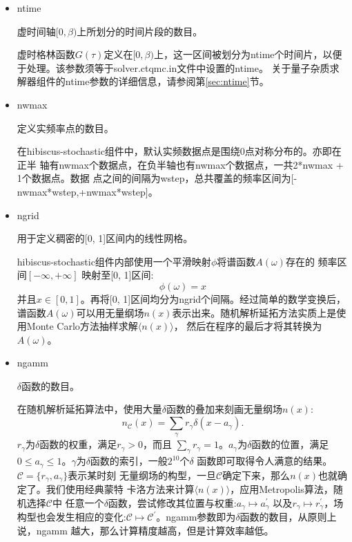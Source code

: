 \begin{itemize}
\item {\color{red}ntime}

虚时间轴$[0,\beta)$上所划分的时间片段的数目。

虚时格林函数$G(\tau)$定义在$[0,\beta)$上，这一区间被划分为ntime个时间片，以便
于处理。该参数须等于solver.ctqmc.in文件中设置的ntime。
关于量子杂质求解器组件的ntime参数的详细信息，请参阅第\ref{sec:ntime}节。

\item {\color{red}nwmax}

定义实频率点的数目。

在hibiscus-stochastic组件中，默认实频数据点是围绕0点对称分布的。亦即在正半
轴有nwmax个数据点，在负半轴也有nwmax个数据点，一共2*nwmax + 1个数据点。数据
点之间的间隔为wstep，总共覆盖的频率区间为[-nwmax*wstep,+nwmax*wstep]。

\item {\color{red}ngrid}

用于定义稠密的[0, 1]区间内的线性网格。

hibiscus-stochastic组件内部使用一个平滑映射$\phi$将谱函数$A(\omega)$存在的
频率区间$[−\infty, +\infty]$
映射至[0, 1]区间:
\begin{equation}
\phi(\omega) = x
\end{equation}
并且$x \in [0,1]$。再将[0, 1]区间均分为ngrid个间隔。经过简单的数学变换后，
谱函数$A(\omega)$可以用无量纲场$n(x)$表示出来。随机解析延拓方法实质上是使
用Monte Carlo方法抽样求解$\langle n(x) \rangle$，
然后在程序的最后才将其转换为$A(\omega)$。

\item {\color{red}ngamm}

$\delta$函数的数目。

在随机解析延拓算法中，使用大量$\delta$函数的叠加来刻画无量纲场$n(x)$:
\begin{equation}
\label{eq:ncx}
n_{\mathcal{C}}(x) = \sum_{\gamma} r_{\gamma} \delta(x - a_{\gamma}).
\end{equation}
$r_{\gamma}$为$\delta$函数的权重，满足$r_{\gamma} > 0 $，而且
$\sum_{\gamma}r_{\gamma} = 1$。$a_{\gamma}$为$\delta$函数的位置，满足
$0 \leq a_{\gamma} \leq 1$。$\gamma$为$\delta$函数的索引，一般$2^{10}$个$\delta$
函数即可取得令人满意的结果。$\mathcal{C} = \{r_{\gamma}, a_{\gamma}\}$表示某时刻
无量纲场的构型，一旦$\mathcal{C}$确定下来，那么$n(x)$也就确定了。我们使用经典蒙特
卡洛方法来计算$\langle n(x) \rangle$，应用Metropolis算法，随机选择$\mathcal{C}$中
任意一个$\delta$函数，尝试修改其位置与权重:$a_{\gamma} \mapsto a^{\prime}_{\gamma}$
以及$r_{\gamma} \mapsto r^{\prime}_{\gamma}$，场构型也会发生相应的变化:$\mathcal{C} 
\mapsto \mathcal{C}^{\prime}$。ngamm参数即为$\delta$函数的数目，从原则上说，ngamm
越大，那么计算精度越高，但是计算效率越低。


\end{itemize}
